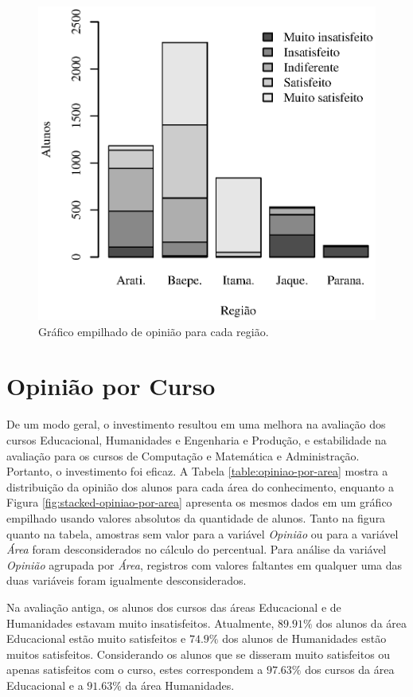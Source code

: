 \documentclass[10pt,a4paper,oneside]{article}
\newcommand{\adm}{Administração\xspace}
\newcommand{\comp}{Computação e Matemática\xspace}
\newcommand{\edu}{Educacional\xspace}
\newcommand{\eng}{Engenharia e Produção\xspace}
\newcommand{\hum}{Humanidades\xspace}
\begin{document}
\begin{figure}[!h]
	\centering
	\includegraphics[width=.75\linewidth]{plots/stacked_opiniao_por_regiao.eps}
	\caption{Gráfico empilhado de opinião para cada região.}
	\label{fig:stacked-opiniao-por-regiao}
\end{figure}


\clearpage{}

\FloatBarrier
\section{Opinião por Curso}
\label{section:opiniao-curso}

De um modo geral, o investimento resultou em uma melhora na avaliação dos cursos \edu, \hum e \eng, e estabilidade na avaliação para os cursos de \comp e \adm. Portanto, o investimento foi eficaz. A Tabela \ref{table:opiniao-por-area} mostra a distribuição da opinião dos alunos para cada área do conhecimento, enquanto a Figura \ref{fig:stacked-opiniao-por-area} apresenta os mesmos dados em um gráfico empilhado usando valores absolutos da quantidade de alunos. Tanto na figura quanto na tabela, amostras sem valor para a variável \textit{Opinião} ou para a variável \textit{Área} foram desconsiderados no cálculo do percentual. Para análise da variável \textit{Opinião} agrupada por \textit{Área}, registros com valores faltantes em qualquer uma das duas variáveis foram igualmente desconsiderados.

Na avaliação antiga, os alunos dos cursos das áreas \edu e de \hum estavam muito insatisfeitos. Atualmente, $89.91\%$ dos alunos da área \edu estão muito satisfeitos e $74.9\%$ dos alunos de \hum estão muitos satisfeitos. Considerando os alunos que se disseram muito satisfeitos ou apenas satisfeitos com o curso, estes correspondem a $97.63\%$ dos cursos da área \edu e a $91.63\%$ da área \hum.
\end{document}
